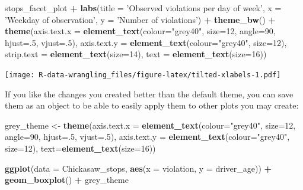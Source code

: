 \documentclass[]{book}
\newenvironment{Shaded}{\begin{snugshade}}{\end{snugshade}}
\newcommand{\KeywordTok}[1]{\textcolor[rgb]{0.13,0.29,0.53}{\textbf{#1}}}
\newcommand{\DataTypeTok}[1]{\textcolor[rgb]{0.13,0.29,0.53}{#1}}
\newcommand{\DecValTok}[1]{\textcolor[rgb]{0.00,0.00,0.81}{#1}}
\newcommand{\StringTok}[1]{\textcolor[rgb]{0.31,0.60,0.02}{#1}}
\newcommand{\OperatorTok}[1]{\textcolor[rgb]{0.81,0.36,0.00}{\textbf{#1}}}
\newcommand{\NormalTok}[1]{#1}
\theoremstyle{definition}
\theoremstyle{definition}
\theoremstyle{definition}
\theoremstyle{remark}
\begin{document}
\begin{Shaded}
\begin{Highlighting}[]
\NormalTok{stops_facet_plot }\OperatorTok{+}
\StringTok{  }\KeywordTok{labs}\NormalTok{(}\DataTypeTok{title =} \StringTok{'Observed violations per day of week'}\NormalTok{,}
         \DataTypeTok{x =} \StringTok{'Weekday of observation'}\NormalTok{,}
         \DataTypeTok{y =} \StringTok{'Number of violations'}\NormalTok{) }\OperatorTok{+}
\StringTok{  }\KeywordTok{theme_bw}\NormalTok{() }\OperatorTok{+}\StringTok{ }
\StringTok{  }\KeywordTok{theme}\NormalTok{(}\DataTypeTok{axis.text.x =} \KeywordTok{element_text}\NormalTok{(}\DataTypeTok{colour=}\StringTok{"grey40"}\NormalTok{, }\DataTypeTok{size=}\DecValTok{12}\NormalTok{, }\DataTypeTok{angle=}\DecValTok{90}\NormalTok{, }\DataTypeTok{hjust=}\NormalTok{.}\DecValTok{5}\NormalTok{, }\DataTypeTok{vjust=}\NormalTok{.}\DecValTok{5}\NormalTok{),}
        \DataTypeTok{axis.text.y =} \KeywordTok{element_text}\NormalTok{(}\DataTypeTok{colour=}\StringTok{"grey40"}\NormalTok{, }\DataTypeTok{size=}\DecValTok{12}\NormalTok{),}
        \DataTypeTok{strip.text =} \KeywordTok{element_text}\NormalTok{(}\DataTypeTok{size=}\DecValTok{14}\NormalTok{),}
        \DataTypeTok{text =} \KeywordTok{element_text}\NormalTok{(}\DataTypeTok{size=}\DecValTok{16}\NormalTok{))}
\end{Highlighting}
\end{Shaded}

\texttt{[image: R-data-wrangling\_files/figure-latex/tilted-xlabels-1.pdf]}

If you like the changes you created better than the default theme, you
can save them as an object to be able to easily apply them to other
plots you may create:

\begin{Shaded}
\begin{Highlighting}[]
\NormalTok{grey_theme <-}\StringTok{ }\KeywordTok{theme}\NormalTok{(}\DataTypeTok{axis.text.x =} \KeywordTok{element_text}\NormalTok{(}\DataTypeTok{colour=}\StringTok{"grey40"}\NormalTok{, }\DataTypeTok{size=}\DecValTok{12}\NormalTok{, }\DataTypeTok{angle=}\DecValTok{90}\NormalTok{, }\DataTypeTok{hjust=}\NormalTok{.}\DecValTok{5}\NormalTok{, }\DataTypeTok{vjust=}\NormalTok{.}\DecValTok{5}\NormalTok{),}
                   \DataTypeTok{axis.text.y =} \KeywordTok{element_text}\NormalTok{(}\DataTypeTok{colour=}\StringTok{"grey40"}\NormalTok{, }\DataTypeTok{size=}\DecValTok{12}\NormalTok{), }\DataTypeTok{text=}\KeywordTok{element_text}\NormalTok{(}\DataTypeTok{size=}\DecValTok{16}\NormalTok{))}

\KeywordTok{ggplot}\NormalTok{(}\DataTypeTok{data =}\NormalTok{ Chickasaw_stops, }\KeywordTok{aes}\NormalTok{(}\DataTypeTok{x =}\NormalTok{ violation, }\DataTypeTok{y =}\NormalTok{ driver_age)) }\OperatorTok{+}
\StringTok{  }\KeywordTok{geom_boxplot}\NormalTok{() }\OperatorTok{+}\StringTok{ }
\StringTok{  }\NormalTok{grey_theme}
\end{Highlighting}
\end{Shaded}
\end{document}
